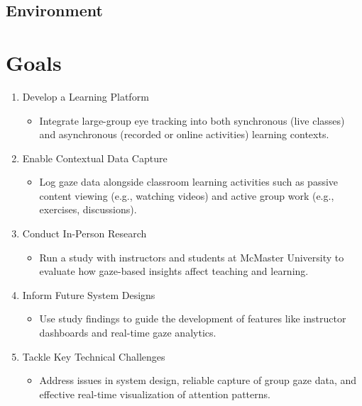 \documentclass{article}
\begin{document}
\subsection{Environment}


\section{Goals}

\begin{enumerate}
    \item Develop a Learning Platform
    \begin{itemize}
        \item Integrate large-group eye tracking into both synchronous (live classes) 
        and asynchronous (recorded or online activities) learning contexts.
    \end{itemize}

    \item Enable Contextual Data Capture
    \begin{itemize}
        \item Log gaze data alongside classroom learning activities such as passive 
        content viewing (e.g., watching videos) and active group work 
        (e.g., exercises, discussions).
    \end{itemize}

    \item Conduct In-Person Research
    \begin{itemize}
        \item Run a study with instructors and students at McMaster University 
        to evaluate how gaze-based insights affect teaching and learning.
    \end{itemize}

    \item Inform Future System Designs
    \begin{itemize}
        \item Use study findings to guide the development of features like 
        instructor dashboards and real-time gaze analytics.
    \end{itemize}

    \item Tackle Key Technical Challenges
    \begin{itemize}
        \item Address issues in system design, reliable capture of group gaze data, 
        and effective real-time visualization of attention patterns.
    \end{itemize}
\end{enumerate}
\end{document}
